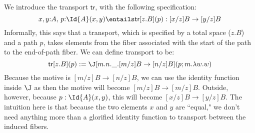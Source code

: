 \documentclass[12pt]{article}
\begin{document}
We introduce the transport $\textsf{tr}$, with the following specification:
\[x,y{:}A,\, p{:}\Id{A}(x,y)\entails \textsf{tr}[z.B](p):[x/z]B\to[y/z]B\]
Informally, this says that a transport, which is specified by a total space ($z.B$) and a path $p$, takes elements from the fiber associated with the start of the path to the end-of-path fiber. We can define transport to be:
\[\textsf{tr}[z.B](p) := \J[m.n.\_.[m/z]B\to[n/z]B](p;m.\lambda w.w)\]
Because the motive is $[m/z]B\to[n/z]B$, we can use the identity function inside $\J$ as then the motive will become $[m/z]B\to[m/z]B$. Outside, however, because $p:\Id{A}(x,y)$, this will become $[x/z]B\to[y/z]B$. The intuition here is that because the two elements $x$ and $y$ are ``equal," we don't need anything more than a glorified identity function to transport between the induced fibers.
\end{document}
